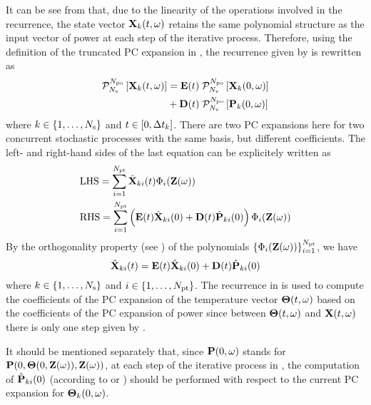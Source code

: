 It can be see from  that, due to the linearity of the operations involved in the recurrence, the state vector $\mathbf{X}_k(t, \omega)$ retains the same polynomial structure as the input vector of power at each step of the iterative process. Therefore, using the definition of the truncated PC expansion in , the recurrence given by  is rewritten as
\begin{align*}
  \oPC{\vars}{\pcorder}{\vX_k(\t, \o)} & = \mE(\t) \; \oPC{\vars}{\pcorder}{\vX_k(0, \o)} \\
  & {} + \mD(\t) \; \oPC{\vars}{\pcorder}{\vP_k(0, \o)}
\end{align*}
where $k \in \{ 1, \dotsc, N_\text{s} \}$ and $t \in [0, \Delta t_k]$. There are two PC expansions here for two concurrent stochastic processes with the same basis, but different coefficients. The left- and right-hand sides of the last equation can be explicitely written as
\begin{align*}
  & \text{LHS} = \sum_{i = 1}^{\pcterms} \pcc{\vX}_{ki}(\t) \pcb_i(\vZ(\o)) \\
  & \text{RHS} = \sum_{i = 1}^{\pcterms} \left( \mE(\t) \pcc{\vX}_{ki}(0) + \mD(\t) \pcc{\vP}_{ki}(0) \right) \pcb_i(\vZ(\o))
\end{align*}
By the orthogonality property (see ) of the polynomials $\{ \Phi_i(\mathbf{Z}(\omega)) \}_{i = 1}^{{N_\text{pt}}}$, we have
\begin{equation} \elabel{pc-recurrence}
  \pcc{\vX}_{ki}(\t) = \mE(\t) \pcc{\vX}_{ki}(0) + \mD(\t) \pcc{\vP}_{ki}(0)
\end{equation}
where $k \in \{ 1, \dots, N_\text{s} \}$ and $i \in \{ 1, \dotsc, {N_\text{pt}} \}$. The recurrence in  is used to compute the coefficients of the PC expansion of the temperature vector ${\boldsymbol\Theta}(t, \omega)$ based on the coefficients of the PC expansion of power since between ${\boldsymbol\Theta}(t, \omega)$ and $\mathbf{X}(t, \omega)$ there is only one step given by .

It should be mentioned separately that, since $\mathbf{P}(0, \omega)$ stands for $\mathbf{P}(0, {\boldsymbol\Theta}(0, \mathbf{Z}(\omega)), \mathbf{Z}(\omega))$, at each step of the iterative process in , the computation of $\hat{\mathbf{P}}_{ki}(0)$ (according to  or ) should be performed with respect to the current PC expansion for ${\boldsymbol\Theta}_k(0, \omega)$.
